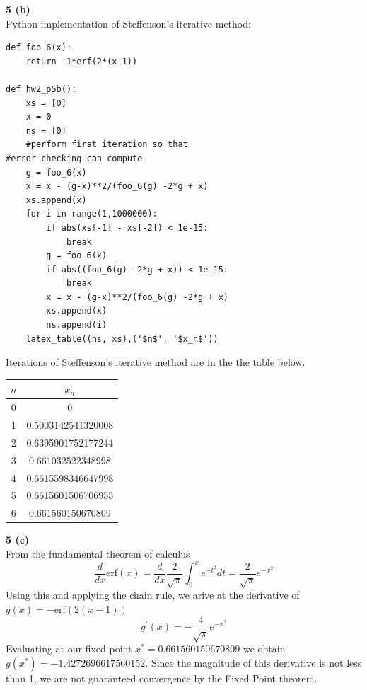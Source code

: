 \documentclass[12pt]{article}
\newcommand{\problem}[1]{\hspace{-4 ex} \large \textbf{#1}\\}
\begin{document}
	\clearpage
	
\problem{5 (b)}
	Python implementation of Steffenson's iterative method:
	\singlespacing
	\begin{lstlisting}
def foo_6(x):
	return -1*erf(2*(x-1))
	
def hw2_p5b():
	xs = [0]
	x = 0
	ns = [0]
	#perform first iteration so that 
#error checking can compute
	g = foo_6(x)
	x = x - (g-x)**2/(foo_6(g) -2*g + x)
	xs.append(x)
	for i in range(1,1000000): 
		if abs(xs[-1] - xs[-2]) < 1e-15:
			break
		g = foo_6(x)
		if abs((foo_6(g) -2*g + x)) < 1e-15:
			break
		x = x - (g-x)**2/(foo_6(g) -2*g + x)
		xs.append(x)
		ns.append(i)
	latex_table((ns, xs),('$n$', '$x_n$'))
	\end{lstlisting}
	\doublespacing
	Iterations of Steffenson's iterative method are in the the table below.
	\begin{center}
		\begin{tabular}{|c|c|}
			\hline
			$n$&$x_n$\\ \hline
			0&0\\ \hline
			1&0.5003142541320008\\ \hline
			2&0.6395901752177244\\ \hline
			3&0.661032522348998\\ \hline
			4&0.6615598346647998\\ \hline
			5&0.6615601506706955\\ \hline
			6&0.661560150670809\\ \hline
		\end{tabular}
	\end{center}

\problem{5 (c)}
	From the fundamental theorem of calculus 
	$$
	\frac{d}{dx}\text{erf}(x) = \frac{d}{dx}\frac{2}{\sqrt{\pi}}\int_0^x e^{-t^2}dt = \frac{2}{\sqrt{\pi}} e^{-x^2}
	$$
	Using this and applying the chain rule, we arive at the derivative of $g(x) = -\text{erf}(2(x-1))$ \\
	$$
	g^\prime(x) = -\frac{4}{\sqrt{\pi}} e^{-x^2}
	$$
	Evaluating at our fixed point $x^* = 0.661560150670809$ we obtain $g(x^*) = -1.4272696617560152$. Since the magnitude of this derivative is not less than 1, we are not guaranteed convergence by the Fixed Point theorem. 	
	
\end{document}
